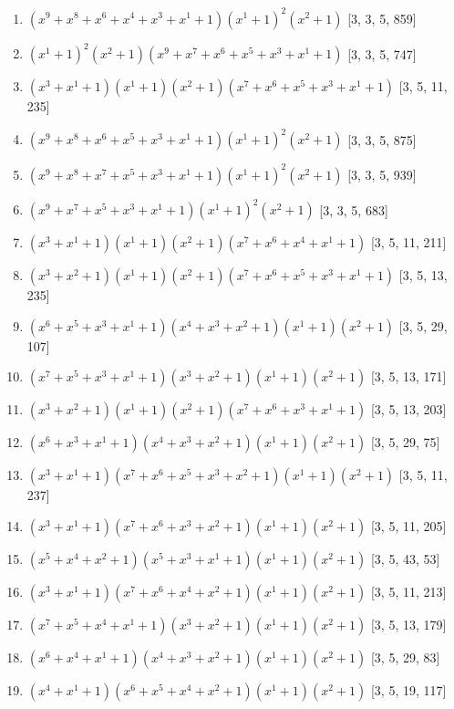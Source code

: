 \documentclass[10pt,twocolumn]{article}
\begin{document}
\begin{enumerate}
\item $(x^{9} + x^{8} + x^{6} + x^{4} + x^{3} + x^{1} + 1)(x^{1} + 1)^{2}(x^{2} + 1)$  [3, 3, 5, 859]
\item $(x^{1} + 1)^{2}(x^{2} + 1)(x^{9} + x^{7} + x^{6} + x^{5} + x^{3} + x^{1} + 1)$  [3, 3, 5, 747]
\item $(x^{3} + x^{1} + 1)(x^{1} + 1)(x^{2} + 1)(x^{7} + x^{6} + x^{5} + x^{3} + x^{1} + 1)$  [3, 5, 11, 235]
\item $(x^{9} + x^{8} + x^{6} + x^{5} + x^{3} + x^{1} + 1)(x^{1} + 1)^{2}(x^{2} + 1)$  [3, 3, 5, 875]
\item $(x^{9} + x^{8} + x^{7} + x^{5} + x^{3} + x^{1} + 1)(x^{1} + 1)^{2}(x^{2} + 1)$  [3, 3, 5, 939]
\item $(x^{9} + x^{7} + x^{5} + x^{3} + x^{1} + 1)(x^{1} + 1)^{2}(x^{2} + 1)$  [3, 3, 5, 683]
\item $(x^{3} + x^{1} + 1)(x^{1} + 1)(x^{2} + 1)(x^{7} + x^{6} + x^{4} + x^{1} + 1)$  [3, 5, 11, 211]
\item $(x^{3} + x^{2} + 1)(x^{1} + 1)(x^{2} + 1)(x^{7} + x^{6} + x^{5} + x^{3} + x^{1} + 1)$  [3, 5, 13, 235]
\item $(x^{6} + x^{5} + x^{3} + x^{1} + 1)(x^{4} + x^{3} + x^{2} + 1)(x^{1} + 1)(x^{2} + 1)$  [3, 5, 29, 107]
\item $(x^{7} + x^{5} + x^{3} + x^{1} + 1)(x^{3} + x^{2} + 1)(x^{1} + 1)(x^{2} + 1)$  [3, 5, 13, 171]
\item $(x^{3} + x^{2} + 1)(x^{1} + 1)(x^{2} + 1)(x^{7} + x^{6} + x^{3} + x^{1} + 1)$  [3, 5, 13, 203]
\item $(x^{6} + x^{3} + x^{1} + 1)(x^{4} + x^{3} + x^{2} + 1)(x^{1} + 1)(x^{2} + 1)$  [3, 5, 29, 75]
\item $(x^{3} + x^{1} + 1)(x^{7} + x^{6} + x^{5} + x^{3} + x^{2} + 1)(x^{1} + 1)(x^{2} + 1)$  [3, 5, 11, 237]
\item $(x^{3} + x^{1} + 1)(x^{7} + x^{6} + x^{3} + x^{2} + 1)(x^{1} + 1)(x^{2} + 1)$  [3, 5, 11, 205]
\item $(x^{5} + x^{4} + x^{2} + 1)(x^{5} + x^{3} + x^{1} + 1)(x^{1} + 1)(x^{2} + 1)$  [3, 5, 43, 53]
\item $(x^{3} + x^{1} + 1)(x^{7} + x^{6} + x^{4} + x^{2} + 1)(x^{1} + 1)(x^{2} + 1)$  [3, 5, 11, 213]
\item $(x^{7} + x^{5} + x^{4} + x^{1} + 1)(x^{3} + x^{2} + 1)(x^{1} + 1)(x^{2} + 1)$  [3, 5, 13, 179]
\item $(x^{6} + x^{4} + x^{1} + 1)(x^{4} + x^{3} + x^{2} + 1)(x^{1} + 1)(x^{2} + 1)$  [3, 5, 29, 83]
\item $(x^{4} + x^{1} + 1)(x^{6} + x^{5} + x^{4} + x^{2} + 1)(x^{1} + 1)(x^{2} + 1)$  [3, 5, 19, 117]

\end{enumerate}
\end{document}
